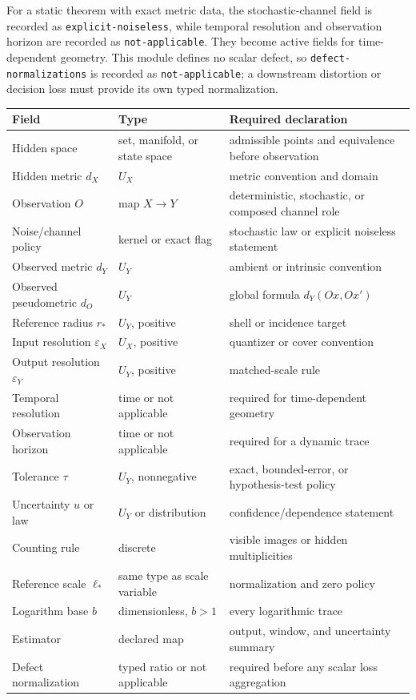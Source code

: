 \documentclass[11pt,a4paper]{article}
\theoremstyle{definition}
\theoremstyle{plain}
\theoremstyle{remark}
\begin{document}
For a static theorem with exact metric data, the stochastic-channel field
is recorded as \texttt{explicit-noiseless}, while temporal resolution and
observation horizon are recorded as \texttt{not-applicable}. They become
active fields for time-dependent geometry. This module defines no scalar
defect, so \texttt{defect-normalizations} is recorded as
\texttt{not-applicable}; a downstream distortion or decision loss must
provide its own typed normalization.

\begin{longtable}{L{0.23\textwidth}L{0.18\textwidth}L{0.49\textwidth}}
\toprule
Field & Type & Required declaration\\
\midrule
\endhead
Hidden space & set, manifold, or state space & admissible points and
equivalence before observation\\
Hidden metric $d_X$ & $U_X$ & metric convention and domain\\
Observation $O$ & map $X\to Y$ & deterministic, stochastic, or composed
channel role\\
Noise/channel policy & kernel or exact flag & stochastic law or explicit
noiseless statement\\
Observed metric $d_Y$ & $U_Y$ & ambient or intrinsic convention\\
Observed pseudometric $d_O$ & $U_Y$ & global formula
$d_Y(Ox,Ox')$\\
Reference radius $r_*$ & $U_Y$, positive & shell or incidence target\\
Input resolution $\varepsilon_X$ & $U_X$, positive & quantizer or cover
convention\\
Output resolution $\varepsilon_Y$ & $U_Y$, positive & matched-scale rule\\
Temporal resolution & time or not applicable & required for
time-dependent geometry\\
Observation horizon & time or not applicable & required for a dynamic
trace\\
Tolerance $\tau$ & $U_Y$, nonnegative & exact, bounded-error, or
hypothesis-test policy\\
Uncertainty $u$ or law & $U_Y$ or distribution & confidence/dependence
statement\\
Counting rule & discrete & visible images or hidden multiplicities\\
Reference scale $\ell_*$ & same type as scale variable & normalization and
zero policy\\
Logarithm base $b$ & dimensionless, $b>1$ & every logarithmic trace\\
Estimator & declared map & output, window, and uncertainty summary\\
Defect normalization & typed ratio or not applicable & required before
any scalar loss aggregation\\
\bottomrule
\end{longtable}
\end{document}
